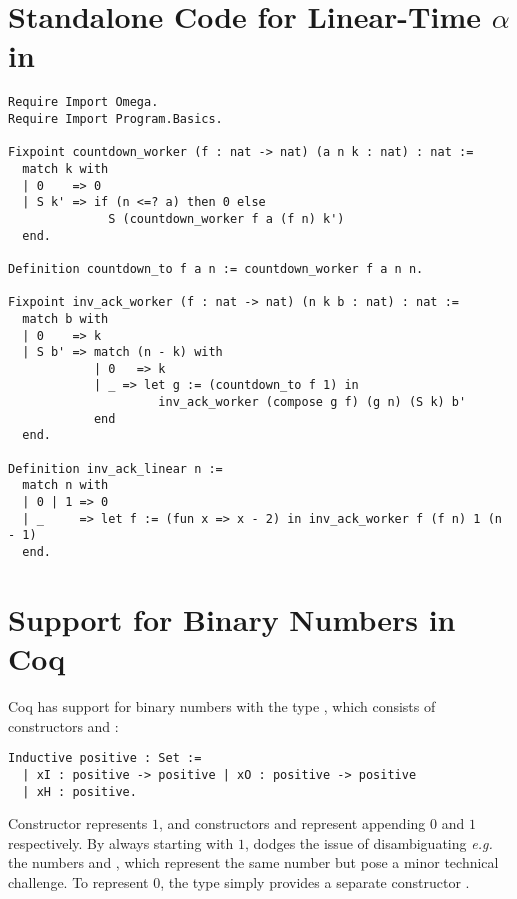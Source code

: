 \section{Standalone Code for Linear-Time $\alpha$ in }
\label{apx:standalone_nat}
\begin{lstlisting}
Require Import Omega.
Require Import Program.Basics.

Fixpoint countdown_worker (f : nat -> nat) (a n k : nat) : nat :=
  match k with
  | 0    => 0
  | S k' => if (n <=? a) then 0 else
              S (countdown_worker f a (f n) k')
  end.

Definition countdown_to f a n := countdown_worker f a n n.

Fixpoint inv_ack_worker (f : nat -> nat) (n k b : nat) : nat :=
  match b with
  | 0    => k
  | S b' => match (n - k) with
            | 0   => k
            | _ => let g := (countdown_to f 1) in
                     inv_ack_worker (compose g f) (g n) (S k) b'
            end
  end.

Definition inv_ack_linear n :=
  match n with
  | 0 | 1 => 0
  | _     => let f := (fun x => x - 2) in inv_ack_worker f (f n) 1 (n - 1)
  end.
\end{lstlisting}

\section{Support for Binary Numbers in Coq}
\label{apx:bin_in_coq}
Coq has support for binary numbers with the type , which consists 
of constructors  and :
\begin{lstlisting}
Inductive positive : Set := 
  | xI : positive -> positive | xO : positive -> positive
  | xH : positive.
\end{lstlisting}
Constructor  represents $1$, and constructors  and  represent 
appending $0$ and $1$ respectively. 
By always starting with $1$,  dodges
the issue of disambiguating \emph{e.g.} the numbers  and 
, which represent the same number but pose
a minor technical challenge. 
To represent $0$, the type  simply provides a separate constructor . 

